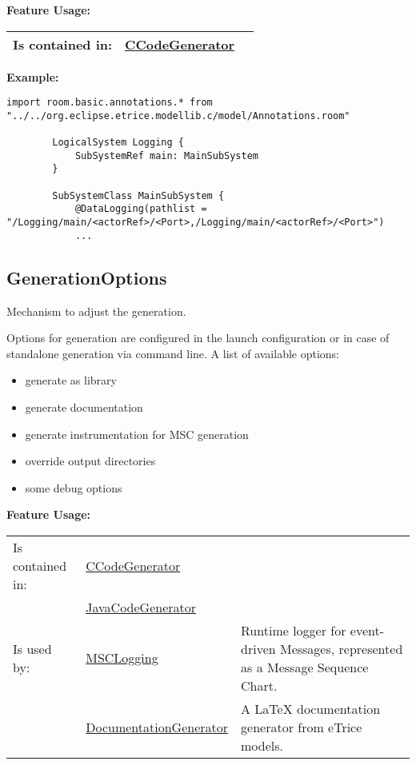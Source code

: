 	\begingroup
	\textbf{Feature Usage:}
	\renewcommand{\arraystretch}{1.8} %
	\begin{longtable}{l|l p{}}
		\hline
	Is contained in: & \tabitem \hyperlink{ref:CCodeGenerator}{CCodeGenerator}  & \\
	\hline
	\end{longtable}
	\endgroup
		
	\textbf{Example:}
	
		\begin{lstlisting}[language=ROOM]
		import room.basic.annotations.* from "../../org.eclipse.etrice.modellib.c/model/Annotations.room"
		
		LogicalSystem Logging {
		 	SubSystemRef main: MainSubSystem
		}
		
		SubSystemClass MainSubSystem {
		 	@DataLogging(pathlist = "/Logging/main/<actorRef>/<Port>,/Logging/main/<actorRef>/<Port>")
		 	...
		\end{lstlisting}
	
	\vspace{\baselineskip}
	\vspace{\baselineskip}
	\vspace{\baselineskip}
	
\subsection{GenerationOptions}
	\hypertarget{ref:GenerationOptions}{}
	Mechanism to adjust the generation.
		
	Options for generation are configured in the launch configuration or in case of standalone generation via command line.
	A list of available options:	
	\begin{itemize}
		\item generate as library
		\item generate documentation
		\item generate instrumentation for MSC generation
		\item override output directories
		\item some debug options
	\end{itemize}
		
		
		
	\begingroup
	\textbf{Feature Usage:}
	\renewcommand{\arraystretch}{1.8} %
	\begin{longtable}{l|l p{}}
		\hline
	Is contained in: & \tabitem \hyperlink{ref:CCodeGenerator}{CCodeGenerator}  & \\
	& \tabitem \hyperlink{ref:JavaCodeGenerator}{JavaCodeGenerator}  &  \\
	\hline
	Is used by: & \tabitem \hyperlink{ref:MSCLogging}{MSCLogging}  & Runtime logger for event-driven Messages, represented as a Message Sequence Chart.\\
	& \tabitem \hyperlink{ref:DocumentationGenerator}{DocumentationGenerator}  & A LaTeX documentation generator from eTrice models. \\
	\hline
	\end{longtable}
	\endgroup
		

